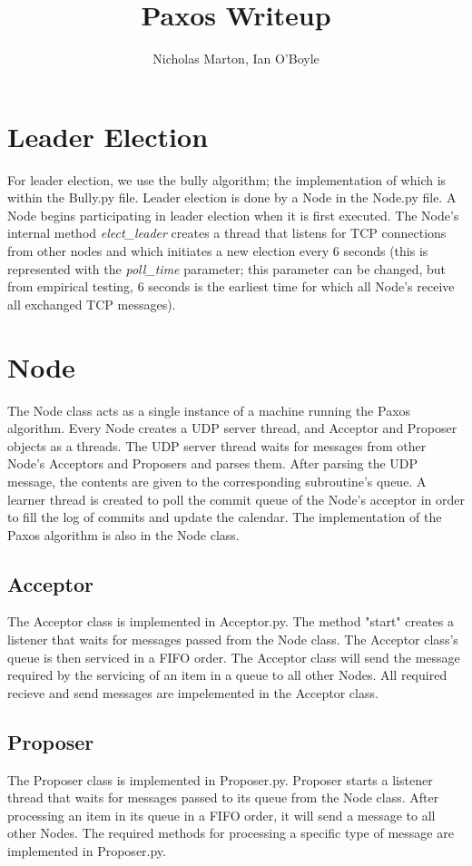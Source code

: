 \documentclass{article}
\begin{document}
	
	\title{Paxos Writeup}
	\author{Nicholas Marton, Ian O'Boyle}
	
	\maketitle
	
	\section{Leader Election}
		For leader election, we use the bully algorithm; the implementation of which is within the Bully.py file.
		Leader election is done by a Node in the Node.py file. A Node begins participating in leader election when it is first executed. The Node's internal method \textit{elect\_leader} creates a thread that listens for TCP connections from other nodes and which initiates a new election every 6 seconds (this is represented with the \textit{poll\_time} parameter; this parameter can be changed, but from empirical testing, 6 seconds is the earliest time for which all Node's receive all exchanged TCP messages).

	\section{Node}
		The Node class acts as a single instance of a machine running the Paxos algorithm. Every Node creates a UDP server thread, and Acceptor and Proposer objects as a threads.
		The UDP server thread waits for messages from other Node's Acceptors and Proposers and parses them. After parsing the UDP message, the contents are given to the corresponding subroutine's queue. A learner thread is created to poll the commit queue of the Node's acceptor in order to fill the log of commits and update the calendar.  The implementation of the Paxos algorithm is also in the Node class. 
	\subsection{Acceptor}
		The Acceptor class is implemented in Acceptor.py. The method "start" creates a listener that waits for messages passed from the Node class. The Acceptor class's queue is then serviced in a FIFO order. The Acceptor class will send the message required by the servicing of an item in a queue to all other Nodes. All required recieve and send messages are impelemented in the Acceptor class.
	\subsection{Proposer}
		The Proposer class is implemented in Proposer.py. Proposer starts a listener thread that waits for messages passed to its queue from the Node class. After processing an item in its queue in a FIFO order, it will send a message to all other Nodes. The required methods for processing a specific type of message are implemented in Proposer.py.
\end{document}
